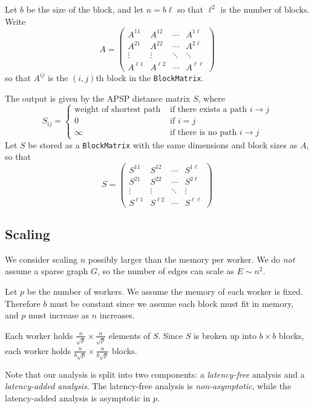 \documentclass{article} %
\begin{document}
Let $b$ be the size of the block, and let $n = b\ell$ so that $\ell^2$
is the number of blocks.  Write
\[
A = \begin{pmatrix}
A^{11} & A^{12} & \cdots & A^{1\ell}\\
A^{21} & A^{22} & \cdots & A^{2\ell}\\
\vdots & \vdots & \ddots & \ddots\\
A^{\ell 1} & A^{\ell 2} & \cdots & A^{\ell \ell}
\end{pmatrix}
\]
so that $A^{ij}$ is the $(i,j)$th block in the {\tt BlockMatrix}.

The output is given by the APSP distance matrix $S$, where
\[
S_{ij} = 
\begin{cases}
\text{weight of shortest path} &\text{ if there exists a path } i \to j\\
0 &\text{ if } i = j\\
\infty &\text{ if there is no path } i \to j
\end{cases}
\]
Let $S$ be stored as a {\tt BlockMatrix} with the same dimensions and
block sizes as $A$, so that
\[
S = \begin{pmatrix}
S^{11} & S^{12} & \cdots & S^{1\ell}\\
S^{21} & S^{22} & \cdots & S^{2\ell}\\
\vdots & \vdots & \ddots & \vdots\\
S^{\ell 1} & S^{\ell 2} & \cdots & S^{\ell \ell}
\end{pmatrix}
\]

\subsection{Scaling}

We consider scaling $n$ possibly larger than the memory per
worker.  We do \emph{not} assume a sparse graph $G$, so the number of
edges can scale as $E \sim n^2$.

Let $p$ be the number of workers.  We assume the memory of each worker
is fixed.  Therefore $b$ must be constant since we assume each block
must fit in memory, and $p$ must increase as $n$ increases.

Each worker holds $\frac{n}{\sqrt{p}} \times \frac{n}{\sqrt{p}}$ elements of $S$. Since $S$ is broken up into $b \times b$ blocks, each worker holds $\frac{n}{b\sqrt{p}} \times \frac{n}{b\sqrt{p}}$ blocks.

Note that our analysis is split into two components: a \emph{latency-free} analysis and a \emph{latency-added analysis}.  The latency-free analysis is \emph{non-asymptotic}, while the latency-added analysis is asymptotic in $p$.
\end{document}
